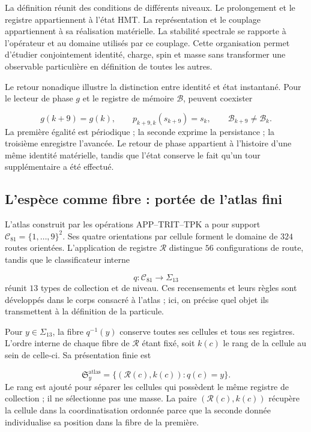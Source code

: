 La définition réunit des conditions de différents niveaux. Le prolongement
et le registre appartiennent à l’état HMT. La représentation et le
couplage appartiennent à sa réalisation matérielle. La stabilité
spectrale se rapporte à l’opérateur et au domaine utilisés par ce
couplage. Cette organisation permet d’étudier conjointement identité,
charge, spin et masse sans transformer une observable particulière en définition
de toutes les autres.


Le retour nonadique illustre la distinction entre identité et état
instantané. Pour le lecteur de phase $g$ et le registre de mémoire
$\mathcal B$, peuvent coexister

\begin{equation}
 g(k+9)=g(k),\qquad
 p_{k+9,k}(s_{k+9})=s_k,\qquad
 \mathcal B_{k+9}\ne\mathcal B_k.
 \label{vi:eq:persistencia-fase-memoria}
\end{equation}
La première égalité est périodique ; la seconde exprime la persistance ; la
troisième enregistre l’avancée. Le retour de phase appartient à l’histoire
d’une même identité matérielle, tandis que l’état conserve le fait qu’un
tour supplémentaire a été effectué.


\subsection{L’espèce comme fibre : portée de l’atlas fini
}
\label{vi:subsec:especie-fibra}

L’atlas construit par les opérations APP--TRIT--TPK a pour support
$\mathcal C_{81}=\{1,\ldots,9\}^2$. Ses quatre orientations par
cellule forment le domaine de $324$ routes orientées. L’application de
registre $\mathcal R$ distingue $56$ configurations de route, tandis que le
classificateur interne

\begin{equation}
 q:\mathcal C_{81}\longrightarrow\Sigma_{13}
 \label{vi:eq:clasificador-especies}
\end{equation}
réunit $13$ types de collection et de niveau. Ces recensements et leurs règles sont
développés dans le corps consacré à l’atlas ; ici, on précise quel objet
ils transmettent à la définition de la particule.


Pour $y\in\Sigma_{13}$, la fibre $q^{-1}(y)$ conserve toutes ses
cellules et tous ses registres. L’ordre interne de chaque fibre de
$\mathcal R$ étant fixé, soit $k(c)$ le rang de la cellule au sein de celle-ci. Sa
présentation finie est

\begin{equation}
 \mathfrak S_y^{\mathrm{atlas}}
 =\{(\mathcal R(c),k(c)):q(c)=y\}.
 \label{vi:eq:multiseccion-atlas}
\end{equation}
Le rang est ajouté pour séparer les cellules qui possèdent le même registre de
collection ; il ne sélectionne pas une masse. La paire $(\mathcal R(c),k(c))$
récupère la cellule dans la coordinatisation ordonnée parce que la seconde donnée
individualise sa position dans la fibre de la première.


